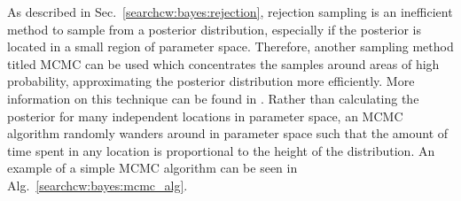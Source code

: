 As described in Sec.~\ref{searchcw:bayes:rejection}, rejection sampling is an inefficient method to sample from a posterior distribution, especially if the posterior is located in a small region of parameter space.
Therefore, another sampling method titled \gls{MCMC} can be used which concentrates the samples around areas of high probability,
approximating the posterior distribution more efficiently. More information on
this technique can be found in
\citep{metropolis1953EquationState,vanravenzwaaij2018SimpleIntroduction,sharma2017MarkovChain}.
Rather than calculating the posterior for many independent locations in
parameter space, an \gls{MCMC} algorithm randomly wanders around in parameter
space such that the amount of time spent in any location is proportional to the
height of the distribution.  An example of a simple \gls{MCMC} algorithm can be
seen in Alg.~\ref{searchcw:bayes:mcmc_alg}.

